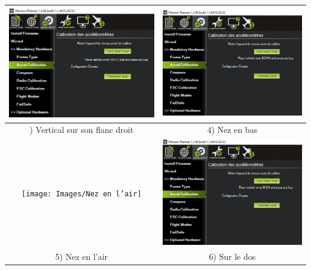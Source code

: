 \begin{table}[H]
\begin{center}
\begin{tabular}{|c|c|}
				
				\centering
				\includegraphics[width=7.5cm]{Images/Vertical sur son flanc droit} & \includegraphics[width=7.5cm]{Images/Nez en bas}
				\\
				\hline
				
				
				\centering
				3) Vertical sur son flanc droit &   4) Nez en bas \\
				\hline
				
				
				\centering
				\texttt{[image: Images/Nez en l’air]} & \includegraphics[width=7.5cm]{Images/Sur le dos}\\
				\hline
				\centering
				
				5) Nez en l’air &   6) Sur le dos \\
				\hline
			\end{tabular}
		\end{center}
	\end{table}	
	
